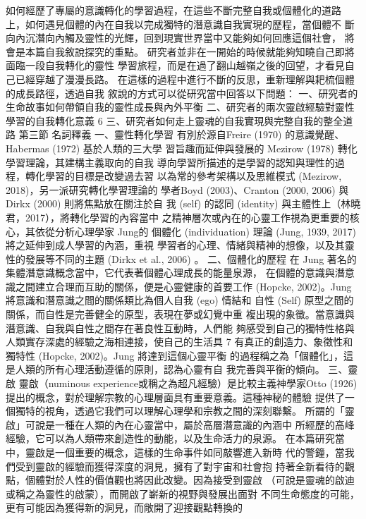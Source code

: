 如何經歷了專屬的意識轉化的學習過程，在這些不斷完整自我或個體化的道路
上，如何遇見個體的內在自我以完成獨特的潛意識自我實現的歷程，當個體不
斷向內沉潛向內觸及靈性的光輝，回到現實世界當中又能夠如何回應這個社會，
將會是本篇自我敘說探究的重點。 
研究者並非在一開始的時候就能夠知曉自己即將面臨一段自我轉化的靈性
學習旅程，而是在過了翻山越嶺之後的回望，才看見自己已經穿越了漫漫長路。
在這樣的過程中進行不斷的反思，重新理解與耙梳個體的成長路徑，透過自我
敘說的方式可以從研究當中回答以下問題： 
一、研究者的生命故事如何帶領自我的靈性成長與內外平衡 
二、研究者的兩次靈啟經驗對靈性學習的自我轉化意義 
6 
三、研究者如何走上靈魂的自我實現與完整自我的整全道路 
第三節 名詞釋義 
一、靈性轉化學習 
有別於源自Freire (1970) 的意識覺醒、Habermas (1972) 基於人類的三大學
習旨趣而延伸與發展的 Mezirow (1978) 轉化學習理論，其建構主義取向的自我
導向學習所描述的是學習的認知與理性的過程，轉化學習的目標是改變過去習
以為常的參考架構以及思維模式 (Mezirow, 2018)，另一派研究轉化學習理論的
學者Boyd (2003)、Cranton (2000, 2006) 與 Dirkx (2000) 則將焦點放在關注於自
我 (self) 的認同 (identity) 與主體性上（林曉君，2017），將轉化學習的內容當中
之精神層次或內在的心靈工作視為更重要的核心，其依從分析心理學家 Jung的
個體化 (individuation) 理論 (Jung, 1939, 2017) 將之延伸到成人學習的內涵，重視
學習者的心理、情緒與精神的想像，以及其靈性的發展等不同的主題 (Dirkx et 
al., 2006) 。 
二、個體化的歷程 
在 Jung 著名的集體潛意識概念當中，它代表著個體心理成長的能量泉源，
在個體的意識與潛意識之間建立合理而互助的關係，便是心靈健康的首要工作 
(Hopcke, 2002)。Jung 將意識和潛意識之間的關係類比為個人自我 (ego) 情結和
自性 (Self) 原型之間的關係，而自性是完善健全的原型，表現在夢或幻覺中重
複出現的象徵。當意識與潛意識、自我與自性之間存在著良性互動時，人們能
夠感受到自己的獨特性格與人類實存深處的經驗之海相連接，使自己的生活具
7 
有真正的創造力、象徵性和獨特性 (Hopcke, 2002)。Jung 將達到這個心靈平衡
的過程稱之為「個體化」，這是人類的所有心理活動遵循的原則，認為心靈有自
我完善與平衡的傾向。 
三、靈啟 
靈啟（numinous experience或稱之為超凡經驗）是比較主義神學家Otto 
(1926) 提出的概念，對於理解宗教的心理層面具有重要意義。這種神秘的體驗
提供了一個獨特的視角，透過它我們可以理解心理學和宗教之間的深刻聯繫。
所謂的「靈啟」可說是一種在人類的內在心靈當中，屬於高層潛意識的內涵中
所經歷的高峰經驗，它可以為人類帶來創造性的動能，以及生命活力的泉源。
在本篇研究當中，靈啟是一個重要的概念，這樣的生命事件如同敲響進入新時
代的警鐘，當我們受到靈啟的經驗而獲得深度的洞見，擁有了對宇宙和社會抱
持著全新看待的觀點，個體對於人性的價值觀也將因此改變。因為接受到靈啟
（可說是靈魂的啟迪或稱之為靈性的啟蒙），而開啟了嶄新的視野與發展出面對
不同生命態度的可能，更有可能因為獲得新的洞見，而敞開了迎接觀點轉換的
